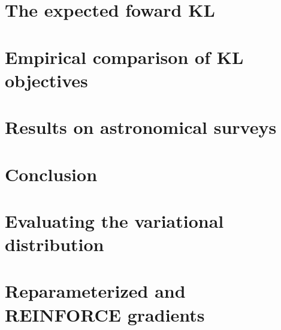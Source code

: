 \documentclass[twoside,11pt]{article}
\begin{document}
\section{The expected foward KL}
\label{sec:wake_sleep}




\section{Empirical comparison of KL objectives}


\section{Results on astronomical surveys}




\section{Conclusion}
\label{sec:discussion}




\acks{}


\newpage

\appendix
\renewcommand\thefigure{A.\arabic{figure}}
\renewcommand\thetable{A.\arabic{table}}
\setcounter{figure}{0}
\setcounter{table}{0}


\section{Evaluating the variational distribution}
\label{sec:eval_var_distr}


\section{Reparameterized and REINFORCE gradients}
\label{sec:reparam_details}


% 
\end{document}
